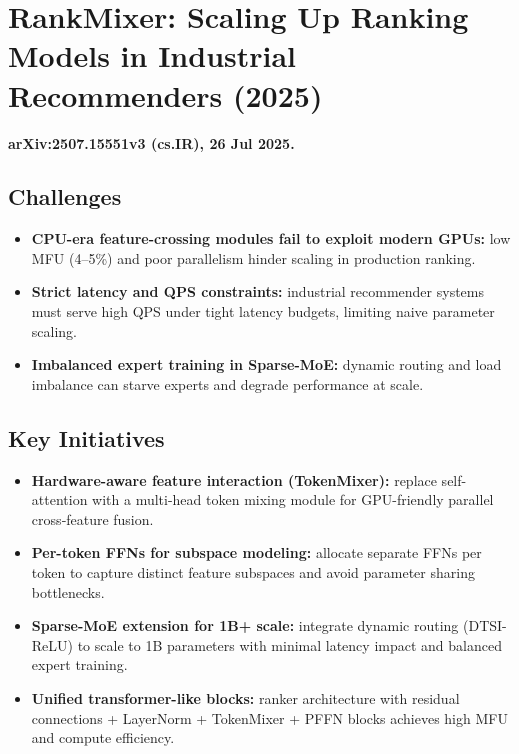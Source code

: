 \documentclass{article}
\begin{document}
\section*{RankMixer: Scaling Up Ranking Models in Industrial Recommenders (2025)}
\textbf{arXiv:2507.15551v3 (cs.IR), 26 Jul 2025.}

\subsection*{Challenges}
\begin{itemize}
  \item \textbf{CPU-era feature-crossing modules fail to exploit modern GPUs:} low MFU (4–5\%) and poor parallelism hinder scaling in production ranking.
  \item \textbf{Strict latency and QPS constraints:} industrial recommender systems must serve high QPS under tight latency budgets, limiting naive parameter scaling.
  \item \textbf{Imbalanced expert training in Sparse-MoE:} dynamic routing and load imbalance can starve experts and degrade performance at scale.
\end{itemize}

\subsection*{Key Initiatives}
\begin{itemize}
  \item \textbf{Hardware-aware feature interaction (TokenMixer):} replace self-attention with a multi-head token mixing module for GPU-friendly parallel cross‑feature fusion.
  \item \textbf{Per-token FFNs for subspace modeling:} allocate separate FFNs per token to capture distinct feature subspaces and avoid parameter sharing bottlenecks.
  \item \textbf{Sparse-MoE extension for 1B+ scale:} integrate dynamic routing (DTSI-ReLU) to scale to 1B parameters with minimal latency impact and balanced expert training.
  \item \textbf{Unified transformer-like blocks:} ranker architecture with residual connections + LayerNorm + TokenMixer + PFFN blocks achieves high MFU and compute efficiency.
\end{itemize}
\end{document}
